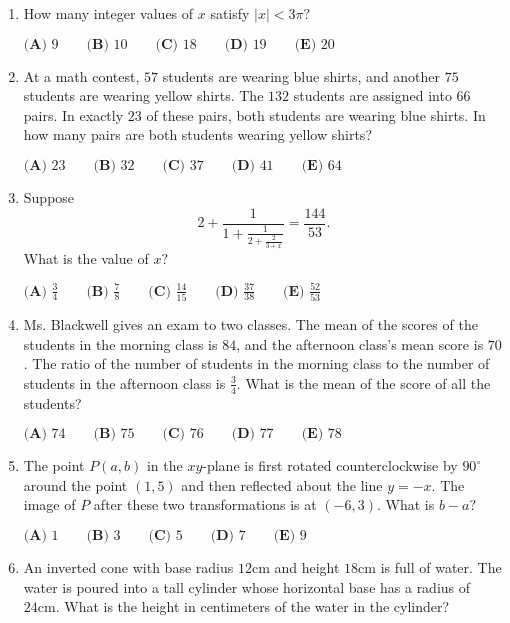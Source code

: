 \documentclass{article}
\begin{document}
\begin{enumerate}[label=\arabic*., itemsep=0.5em]
\item How many integer values of \(x\) satisfy \(|x|<3\pi?\)

\(\textbf{(A) }9 \qquad \textbf{(B) }10 \qquad \textbf{(C) }18 \qquad \textbf{(D) }19 \qquad \textbf{(E) }20\)\par \vspace{0.5em}\item At a math contest, \(57\) students are wearing blue shirts, and another \(75\) students are wearing yellow shirts. The \(132\) students are assigned into \(66\) pairs. In exactly \(23\) of these pairs, both students are wearing blue shirts. In how many pairs are both students wearing yellow shirts?

\(\textbf{(A) }23 \qquad \textbf{(B) }32 \qquad \textbf{(C) }37 \qquad \textbf{(D) }41 \qquad \textbf{(E) }64\)\par \vspace{0.5em}\item Suppose
\begin{equation*}
2+\frac{1}{1+\frac{1}{2+\frac{2}{3+x}}}=\frac{144}{53}.
\end{equation*}
What is the value of \(x?\)

\(\textbf{(A) }\frac34 \qquad \textbf{(B) }\frac78 \qquad \textbf{(C) }\frac{14}{15} \qquad \textbf{(D) }\frac{37}{38} \qquad \textbf{(E) }\frac{52}{53}\)\par \vspace{0.5em}\item Ms. Blackwell gives an exam to two classes. The mean of the scores of the students in the morning class is \(84\), and the afternoon class's mean score is \(70\). The ratio of the number of students in the morning class to the number of students in the afternoon class is \(\frac34\). What is the mean of the score of all the students?

\(\textbf{(A) }74 \qquad \textbf{(B) }75 \qquad \textbf{(C) }76 \qquad \textbf{(D) }77 \qquad \textbf{(E) }78\)\par \vspace{0.5em}\item The point \(P(a,b)\) in the \(xy\)-plane is first rotated counterclockwise by \(90^\circ\) around the point \((1,5)\) and then reflected about the line \(y=-x\). The image of \(P\) after these two transformations is at \((-6,3)\). What is \(b-a?\)

\(\textbf{(A) }1 \qquad \textbf{(B) }3 \qquad \textbf{(C) }5 \qquad \textbf{(D) }7 \qquad \textbf{(E) }9\)\par \vspace{0.5em}\item An inverted cone with base radius \(12 \text{cm}\) and height \(18\text{cm}\) is full of water. The water is poured into a tall cylinder whose horizontal base has a radius of \(24\text{cm}\). What is the height in centimeters of the water in the cylinder?


\end{enumerate}
\end{document}

